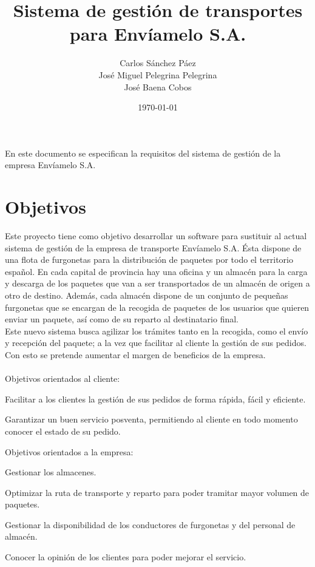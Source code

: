 \documentclass[12pt,spanish]{report}
\title{Sistema de gestión de transportes \\  \small{para Envíamelo S.A.}}
\date{\today}
\author{Carlos Sánchez Páez \\ José Miguel Pelegrina Pelegrina \\ José Baena Cobos}
\begin{document}
\maketitle
En este documento se especifican la requisitos del sistema de gestión de la empresa Envíamelo S.A.

\section*{Objetivos}

Este proyecto tiene como objetivo desarrollar un software para sustituir al actual sistema de gestión de la empresa de transporte Envíamelo S.A. Ésta dispone de una flota de furgonetas para la distribución de paquetes por todo el territorio español. En cada capital de provincia hay una oficina y un almacén para la carga y descarga de los paquetes que van a ser transportados de un almacén de origen a otro de destino. Además, cada almacén dispone de un conjunto de pequeñas furgonetas que se encargan de la recogida de paquetes de los usuarios que quieren enviar un paquete, así como de su reparto al destinatario final. \\
Este nuevo sistema busca agilizar los trámites tanto en la recogida, como el envío y recepción del paquete; a la vez que facilitar al cliente la gestión de sus pedidos. Con esto se pretende aumentar el margen de beneficios de la empresa.\\ \\

Objetivos orientados al cliente: 
\begin{description}[align=right,labelwidth=3cm]
\item [OBJ-1] Facilitar a los clientes la gestión de sus pedidos de forma rápida, fácil y eficiente.
\item [OBJ-2] Garantizar un buen servicio posventa, permitiendo al cliente en todo momento conocer el estado de su pedido.
\end{description}
Objetivos orientados a la empresa:
\begin{description}[align=right,labelwidth=3cm]
\item [OBJ-3] Gestionar los almacenes.
\item [OBJ-4] Optimizar la ruta de transporte y reparto para poder tramitar mayor volumen de paquetes.
\item [OBJ-5] Gestionar la disponibilidad de los conductores de furgonetas y del personal de almacén. 
\item [OBJ-6] Conocer la opinión de los clientes para poder mejorar el servicio.
\end{description}
\end{document}

